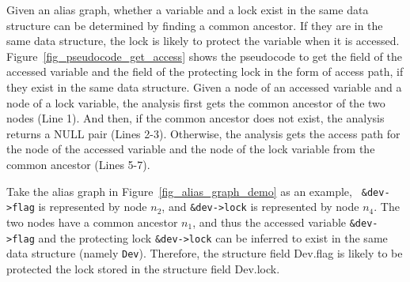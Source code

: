 Given an alias graph, whether a variable and a lock exist in the same data 
structure can be determined by finding a common ancestor. If they are in the 
same data structure, the lock is likely to protect the variable when it is 
accessed. Figure~\ref{fig_pseudocode_get_access} shows the pseudocode to 
get the field of the accessed variable and the field of the protecting lock in 
the form of access path, if they exist in the same data structure. Given a node 
of an accessed variable and a node of a lock variable, the analysis first gets 
the common ancestor of the two nodes (Line 1). And then, if the common ancestor 
does not exist, the analysis returns a NULL pair (Lines 2-3). Otherwise, the 
analysis gets the access path for the node of the accessed variable and the 
node of the lock variable from the common ancestor (Lines 5-7).


Take the alias graph in Figure~\ref{fig_alias_graph_demo} as an example, {\tt 
\&dev->flag} is represented by node $\mathit{n_2}$, and {\tt \&dev->lock} is 
represented by node $\mathit{n_4}$. The two nodes have a common ancestor 
$\mathit{n_1}$, and thus the accessed variable {\tt \&dev->flag} and the 
protecting lock {\tt \&dev->lock} can be inferred to exist in the same data 
structure (namely {\tt Dev}). Therefore, the structure field Dev.flag is likely 
to be protected the lock stored in the structure field Dev.lock.

